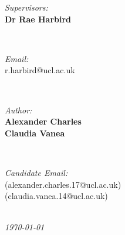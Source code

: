 \documentclass[fontsize=10pt]{extarticle}
\makeatletter
\numberwithin{figure}{section} %
\newcommand{\StudentNameA}{Alexander Charles}
\newcommand{\StudentNumberA}{alexander.charles.17@ucl.ac.uk}
\newcommand{\StudentNameB}{Claudia Vanea}
\newcommand{\StudentNumberB}{claudia.vanea.14@ucl.ac.uk}
\newcommand{\SupervisorNameA}{Dr Rae Harbird}
\newcommand{\SupervisorEmailA}{r.harbird@ucl.ac.uk}
\newcommand{\SupervisorNameB}{Name}
\newcommand{\SupervisorEmailB}{email@gmail.com}
\makeatother
\begin{document}
\begin{titlepage}
\begin{minipage}{0.4\textwidth}
\begin{flushleft} \large
\emph{Supervisors:}\\
\textbf{\SupervisorNameA}\\
\end{flushleft}
\end{minipage}
~
\begin{minipage}{0.4\textwidth}
\begin{flushright} \large
\emph{Email:} \\
\SupervisorEmailA\\

\end{flushright}
\end{minipage}\\[1cm]

\begin{minipage}{0.4\textwidth}
\begin{flushleft} \large
\emph{Author:}\\
	\textbf{\StudentNameA}\\
  \textbf{\StudentNameB}
\end{flushleft}
\end{minipage}
~
\begin{minipage}{0.4\textwidth}
\begin{flushright} \large
\emph{Candidate Email:} \\
(\StudentNumberA)\\
(\StudentNumberB)\\
\end{flushright}
\end{minipage}\\[2cm]

\textit{{\large \today}}\\[1cm] %
\vfill %
\end{titlepage}

\end{document}
